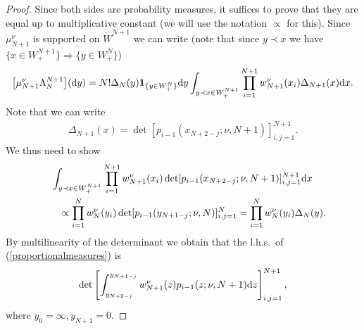 \begin{proof}Since both sides are probability measures, it suffices to prove that they are equal up to multiplicative constant (we will use the notation $\propto$ for this). Since $\mu_{N+1}^{\nu}$ is supported on $\mathring{W}^{N+1}$ we can write (note that since $y\prec x$ we have $\big\{x \in W^{N+1}_+\big\} \Rightarrow \big\{y \in W^{N}_+\big\}$)
\begin{gather*}
\big[\mu_{N+1}^{\nu}\Lambda_N^{N+1}\big]({\rm d}y)=N! \Delta_N(y)\mathbf{1}_{\{y \in W_+^N \}}{\rm d}y \int_{y\prec x \in W^{N+1}_+}^{}\prod_{i=1}^{N+1}w_{N+1}^{\nu}(x_i) \Delta_{N+1}(x){\rm d}x.
\end{gather*}
Note that we can write
\begin{gather*}
\Delta_{N+1}(x)=\det [p_{i-1} (x_{N+2-j};\nu,N+1 ) ]^{N+1}_{i,j=1}.
\end{gather*}
We thus need to show
\begin{gather}
\int_{y\prec x \in W^{N+1}_+}^{}\prod_{i=1}^{N+1}w_{N+1}^{\nu}(x_i) \det [p_{i-1} (x_{N+2-j};\nu,N+1 ) ]^{N+1}_{i,j=1}{\rm d}x\nonumber\\
\qquad {}\propto \prod_{i=1}^{N}w_N^{\nu}(y_i)\det [p_{i-1} (y_{N+1-j};\nu,N ) ]^{N}_{i,j=1}
 =\prod_{i=1}^{N}w_N^{\nu}(y_i)\Delta_N(y) .\label{proportionalmeasures}
\end{gather}
By multilinearity of the determinant we obtain that the l.h.s.\ of (\ref{proportionalmeasures}) is
\begin{gather*}
\det\left[\int_{y_{N+2-j}}^{y_{N+1-j}}w_{N+1}^{\nu}(z)p_{i-1} (z;\nu,N+1 ){\rm d}z\right]^{N+1}_{i,j=1},
\end{gather*}
where $y_0=\infty, y_{N+1}=0$.


\end{proof}
